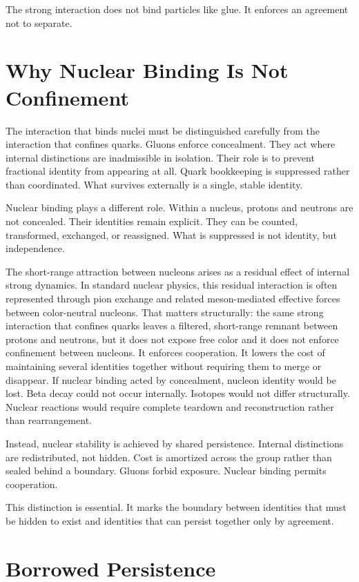 \documentclass[11pt,twoside,openright]{book}
\begin{document}
The strong interaction does not bind particles like glue.
It enforces an agreement not to separate.
\section*{Why Nuclear Binding Is Not Confinement}

The interaction that binds nuclei must be distinguished carefully from the interaction that confines quarks. Gluons enforce concealment. They act where internal distinctions are inadmissible in isolation. Their role is to prevent fractional identity from appearing at all. Quark bookkeeping is suppressed rather than coordinated. What survives externally is a single, stable identity.

Nuclear binding plays a different role. Within a nucleus, protons and neutrons are not concealed. Their identities remain explicit. They can be counted, transformed, exchanged, or reassigned. What is suppressed is not identity, but independence.

The short-range attraction between nucleons arises as a residual effect of internal strong dynamics. In standard nuclear physics, this residual interaction is often represented through pion exchange and related meson-mediated effective forces between color-neutral nucleons. That matters structurally: the same strong interaction that confines quarks leaves a filtered, short-range remnant between protons and neutrons, but it does not expose free color and it does not enforce confinement between nucleons. It enforces cooperation. It lowers the cost of maintaining several identities together without requiring them to merge or disappear. If nuclear binding acted by concealment, nucleon identity would be lost. Beta decay could not occur internally. Isotopes would not differ structurally. Nuclear reactions would require complete teardown and reconstruction rather than rearrangement.

Instead, nuclear stability is achieved by shared persistence. Internal distinctions are redistributed, not hidden. Cost is amortized across the group rather than sealed behind a boundary. Gluons forbid exposure. Nuclear binding permits cooperation.

This distinction is essential. It marks the boundary between identities that must be hidden to exist and identities that can persist together only by agreement.

\section*{Borrowed Persistence}
\end{document}

